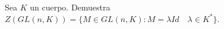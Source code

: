 \question 
Sea $K$ un cuerpo. Demuestra $Z(GL(n,K))=\{M\in GL(n,K): M=\lambda Id \quad \lambda \in K^*\}$.